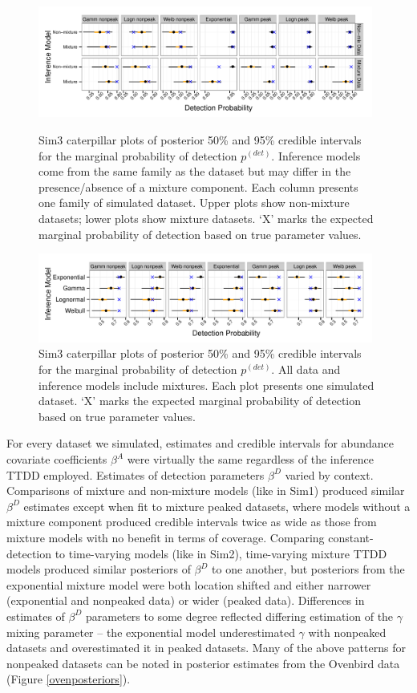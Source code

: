 \documentclass[useAMS,usenatbib,referee,12pt]{article}
\newcommand{\pdet}{p^{(det)}}
\begin{document}
\begin{figure}[h!]\centering
\includegraphics[width=0.98\textwidth]{Sims/SimFull/pdet_cater_correct.pdf}
\caption{\label{pdet_cater_correct} Sim3 caterpillar plots of posterior 50\% and 95\% credible intervals for the marginal probability of detection $\pdet$.  
Inference models come from the same family as the dataset but may differ in the presence/absence of a mixture component.  
Each column presents one family of simulated dataset.  
Upper plots show non-mixture datasets; lower plots show mixture datasets.  
`X' marks the expected marginal probability of detection based on true parameter values.}
\includegraphics[width=0.98\textwidth]{Sims/SimFull/pdet_cater_family.pdf}
\caption{\label{pdet_cater_family}  Sim3 caterpillar plots of posterior 50\% and 95\% credible intervals for the marginal probability of detection $\pdet$. All data and inference models include mixtures.  
Each plot presents one simulated dataset.  
`X' marks the expected marginal probability of detection based on true parameter values.}
\end{figure}

For every dataset we simulated, estimates and credible intervals for abundance covariate coefficients $\beta^A$ were virtually the same regardless of the inference TTDD employed.  
Estimates of detection parameters $\beta^D$ varied by context.  
Comparisons of mixture and non-mixture models (like in Sim1) produced similar $\beta^D$ estimates except when fit to mixture peaked datasets, where models without a mixture component produced credible intervals twice as wide as those from mixture models with no benefit in terms of coverage.
Comparing constant-detection to time-varying models (like in Sim2), time-varying mixture TTDD models produced similar posteriors of $\beta^D$ to one another, but posteriors from the exponential mixture model were both location shifted and either narrower (exponential and nonpeaked data) or wider (peaked data).
Differences in estimates of $\beta^D$ parameters to some degree reflected differing estimation of the $\gamma$ mixing parameter -- the exponential model underestimated $\gamma$ with nonpeaked datasets and overestimated it in peaked datasets.
Many of the above patterns for nonpeaked datasets can be noted in posterior estimates from the Ovenbird data (Figure \ref{ovenposteriors}).
\end{document}
